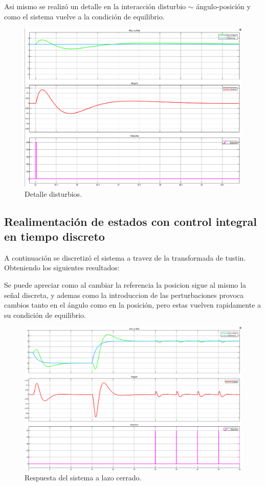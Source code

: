 Asi mismo se realizó un detalle en la interacción disturbio $\sim$ ángulo-posici\'on y como el sistema vuelve a la condici\'on de equilibrio.
\begin{figure}[H]
	\centering
	\includegraphics[width=1\linewidth]{Imagenes/Control_por_realimentacion_integral/detalle_disturbio.png}
	\caption{Detalle disturbios.}
	\label{realmentacion_disturbio}
\end{figure}

\subsection{Realimentaci\'on de estados con control integral en tiempo discreto}
A continuaci\'on se discretiz\'o el sistema a travez de la transformada de tustin. Obteniendo los siguientes resultados:

Se puede apreciar como al cambiar la referencia la posicion sigue al mismo la señal discreta, y ademas como la introduccion de las perturbaciones provoca cambios tanto en el ángulo como en la posición, pero estas vuelven rapidamente a su condición de equilibrio. 
\begin{figure}[H]
	\centering
	\includegraphics[width=1\linewidth]{Imagenes/Control_integral_disc/general.png}
	\caption{Respuesta del sistema a lazo cerrado.}
	\label{realmentacion}
\end{figure}


